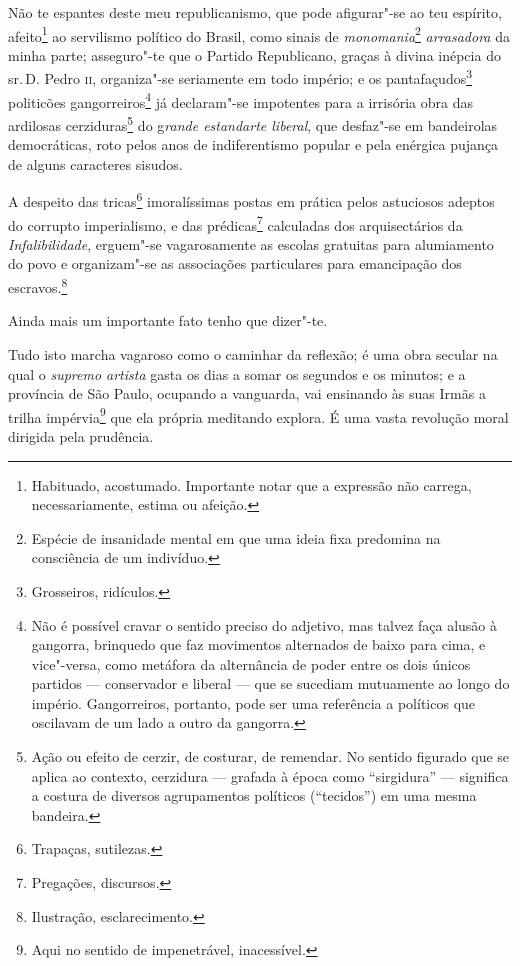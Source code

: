 Não te espantes deste meu republicanismo, que pode afigurar"-se ao teu
espírito, afeito\footnote{Habituado, acostumado. Importante notar que
  a expressão não carrega, necessariamente, estima ou afeição.} ao
servilismo político do Brasil, como sinais de \emph{monomania}\footnote{
  Espécie de insanidade mental em que uma ideia fixa predomina na
  consciência de um indivíduo.} \emph{arrasadora} da minha parte;
asseguro"-te que o Partido Republicano, graças à divina inépcia do sr.\,D.
Pedro \textsc{ii}, organiza"-se seriamente em todo império; e os
pantafaçudos\footnote{Grosseiros, ridículos.} politicões
gangorreiros\footnote{Não é possível cravar o sentido preciso do
  adjetivo, mas talvez faça alusão à gangorra, brinquedo que faz
  movimentos alternados de baixo para cima, e vice"-versa, como metáfora
  da alternância de poder entre os dois únicos partidos --- conservador
  e liberal --- que se sucediam mutuamente ao longo do império.
  Gangorreiros, portanto, pode ser uma referência a políticos que
  oscilavam de um lado a outro da gangorra.} já declaram"-se impotentes
para a irrisória obra das ardilosas cerziduras\footnote{Ação ou efeito
  de cerzir, de costurar, de remendar. No sentido figurado que se aplica
  ao contexto, cerzidura --- grafada à época como ``sirgidura'' ---
  significa a costura de diversos agrupamentos políticos (``tecidos'') em
  uma mesma bandeira.} do g\emph{rande estandarte liberal}, que
desfaz"-se em bandeirolas democráticas, roto pelos anos de indiferentismo
popular e pela enérgica pujança de alguns caracteres sisudos.

A despeito das tricas\footnote{Trapaças, sutilezas.} imoralíssimas
postas em prática pelos astuciosos adeptos do corrupto imperialismo, e
das prédicas\footnote{Pregações, discursos.} calculadas dos
arquisectários da \emph{Infalibilidade}, erguem"-se vagarosamente as
escolas gratuitas para alumiamento do povo e organizam"-se as associações
particulares para emancipação dos escravos.\footnote{Ilustração,
  esclarecimento.}


Ainda mais um importante fato tenho que dizer"-te.

Tudo isto marcha vagaroso como o caminhar da reflexão; é uma obra
secular na qual o \emph{supremo artista} gasta os dias a somar os
segundos e os minutos; e a província de São Paulo, ocupando a vanguarda,
vai ensinando às suas Irmãs a trilha impérvia\footnote{Aqui no sentido
  de impenetrável, inacessível.} que ela própria meditando explora. É
uma vasta revolução moral dirigida pela prudência.

